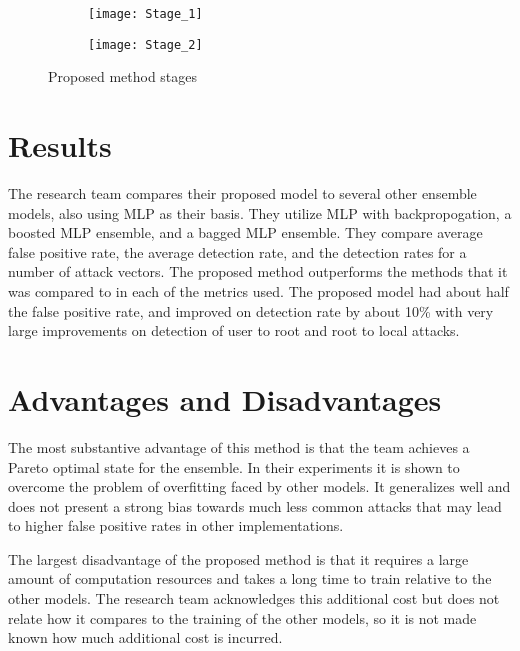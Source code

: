 \documentclass[]{article}
\begin{document}
\begin{figure}[h]
	\centering
	\begin{subfigure}{0.48\linewidth}
		\texttt{[image: Stage\_1]}
	\end{subfigure}
	\hfill
	\begin{subfigure}{0.48\linewidth}
		\texttt{[image: Stage\_2]}
	\end{subfigure}
	\caption{Proposed method stages \cite{Zhao2020}}
\end{figure}


\section{Results}

The research team compares their proposed model to several other ensemble models, also using MLP as their basis.
They utilize MLP with backpropogation, a boosted MLP ensemble, and a bagged MLP ensemble.
They compare average false positive rate, the average detection rate, and the detection rates for a number of attack vectors. 
The proposed method outperforms the methods that it was compared to in each of the metrics used.
The proposed model had about half the false positive rate, and improved on detection rate by about 10\% with very large improvements on detection of user to root and root to local attacks.

\section{Advantages and Disadvantages}

The most substantive advantage of this method is that the team achieves a Pareto optimal state for the ensemble.
In their experiments it is shown to overcome the problem of overfitting faced by other models.
It generalizes well and does not present a strong bias towards much less common attacks that may lead to higher false positive rates in other implementations.

The largest disadvantage of the proposed method is that it requires a large amount of computation resources and takes a long time to train relative to the other models.
The research team acknowledges this additional cost but does not relate how it compares to the training of the other models, so it is not made known how much additional cost is incurred.
\end{document}
